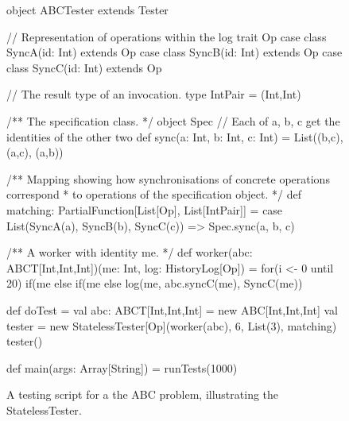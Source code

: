 \begin{figure}
\begin{scala}
object ABCTester extends Tester{
  // Representation of operations within the log
  trait Op 
  case class SyncA(id: Int) extends Op
  case class SyncB(id: Int) extends Op
  case class SyncC(id: Int) extends Op

  // The result type of an invocation.
  type IntPair = (Int,Int)

  /** The specification class. */
  object Spec{
    // Each of a, b, c get the identities of the other two
    def sync(a: Int, b: Int, c: Int) = List((b,c), (a,c), (a,b))
  }

  /** Mapping showing how synchronisations of concrete operations correspond 
    * to operations of the specification object. */
  def matching: PartialFunction[List[Op], List[IntPair]] = {
    case List(SyncA(a), SyncB(b), SyncC(c)) => Spec.sync(a, b, c) 
  }

  /** A worker with identity me. */
  def worker(abc: ABCT[Int,Int,Int])(me: Int, log: HistoryLog[Op]) = {
    for(i <- 0 until 20){
      if(me%
      else if(me%
      else log(me, abc.syncC(me), SyncC(me))
    }
  }

  def doTest = {
    val abc: ABCT[Int,Int,Int] = new ABC[Int,Int,Int]
    val tester = new StatelessTester[Op](worker(abc), 6, List(3), matching)
    tester()
  }

  def main(args: Array[String]) = runTests(1000)
}
\end{scala}
\caption{A testing script for a the ABC problem, illustrating the {\scalashape
    Stateless\-Tester}.\label{fig:ABC}} 
\end{figure}



